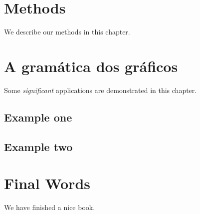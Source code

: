 \documentclass[
  brazilian,
]{book}
\begin{document}
\hypertarget{methods}{%
\chapter{Methods}\label{methods}}

We describe our methods in this chapter.

\hypertarget{a-gramuxe1tica-dos-gruxe1ficos}{%
\chapter{A gramática dos gráficos}\label{a-gramuxe1tica-dos-gruxe1ficos}}

Some \emph{significant} applications are demonstrated in this chapter.

\hypertarget{example-one}{%
\section{Example one}\label{example-one}}

\hypertarget{example-two}{%
\section{Example two}\label{example-two}}

\hypertarget{final-words}{%
\chapter{Final Words}\label{final-words}}

We have finished a nice book.

\renewcommand{\bibname}{Referências}

  
\end{document}
